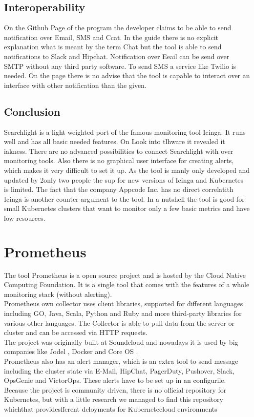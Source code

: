 \subsection{Interoperability}
On the Github Page \cite{searchlight} of the program the developer claims to be able to send notification over Email, SMS and Ccat.
In the guide there is no explicit explanation what is meant by the term Chat but the tool is able to send notifications to Slack \cite{slack} and Hipchat. Notification over Eeail can be send over SMTP without any third party software. To send SMS a service like Twilio \cite{twilio} is needed.
On the page there is no advise that the tool is capable to interact over an interface with other notification than the given. 
\subsection{Conclusion}
Searchlight is a light weighted  port of the famous monitoring tool Icinga. It runs well and has all basic needed features. On Look  into tlhware  it revealed it iakness. There are no advanced possibilities to connect Searchlight with over monitoring tools. Also there is no graphical user interface for creating alerts, which makes it very difficult to set it up. As the tool is manly only developed and updated by 2only two people the sup for new versions of Icinga and Kubernetes is limited. The fact that the company Appcode Inc. has no direct correlatith Icinga is another counter-argument to the tool. In a nutshell the tool is good for small Kubernetes clusters that want to monitor only a few basic metrics and have low resources. 

\section{Prometheus}
\label{Prometheus} %
The tool Prometheus is a open source project and is hosted by the Cloud Native Computing Foundation.
It is a single tool that comes with the features of a whole monitoring stack (without alerting).\\ Prometheus own collector uses client libraries, supported for different languages including GO, Java, Scala, Python and Ruby and more third-party libraries for various other languages. The Collector is able to pull data from the server or cluster and can be accessed via HTTP requests.\\
The project was originally built at Soundcloud and nowadays it is used by big companies like Jodel \cite{jodel}, Docker and Core OS \cite{prometeus}. \\
Prometheus also has an alert manager, which is an extra tool to send message including the cluster state via E-Mail, HipChat, PagerDuty, Pushover, Slack, OpsGenie and VictorOps. These alerts have to be set up in an configurile. \\
Because the project is community driven, there is no official repository for Kubernetes, but with a little research we managed to find this repository \cite{prometheus_kube} whichthat providesfferent deloyments for Kubernetecloud environments
